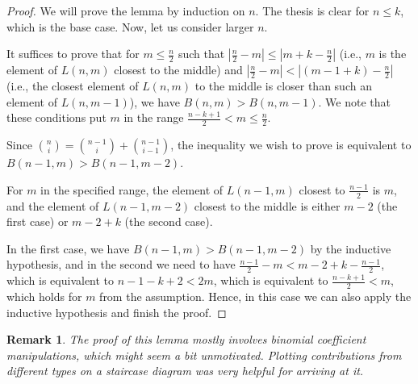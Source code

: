 \documentclass[11pt, reqno]{amsart}
\newtheorem*{remark}{Remark}
\numberwithin{equation}{section}
\begin{document}
\begin{proof}
    We will prove the lemma by induction on $n$.
    The thesis is clear for $n \leqslant k$, which is the base case. Now, let us consider larger $n$.

    It suffices to prove that for $m \leqslant \frac{n}{2}$ such that $|\frac{n}{2}-m|\leqslant |m+k-\frac{n}{2}|$ (i.e., $m$ is the element of $L(n, m)$ closest to the middle) and $|\frac{n}{2}-m|<|(m-1+k)-\frac{n}{2}|$ (i.e., the closest element of $L(n, m)$ to the middle is closer than such an element of $L(n, m-1)$), we have $B(n, m)>B(n, m-1)$. We note that these conditions put $m$ in the range $\frac{n-k+1}{2} < m \leqslant \frac{n}{2}$.
    
    Since $\binom{n}{i}=\binom{n-1}{i} + \binom{n-1}{i-1}$, the inequality we wish to prove is equivalent to $B(n-1, m) > B(n-1, m-2)$.
    
    For $m$ in the specified range, the element of $L(n-1, m)$ closest to $\frac{n-1}{2}$ is $m$, and the element of $L(n-1, m-2)$ closest to the middle is either $m-2$ (the first case) or $m-2+k$ (the second case).
    
    In the first case, we have $B(n-1, m) > B(n-1, m-2)$ by the inductive hypothesis, and in the second we need to have $\frac{n-1}{2}-m<m-2+k-\frac{n-1}{2}$, which is equivalent to $n-1-k+2<2m$, which is equivalent to $\frac{n-k+1}{2}<m$, which holds for $m$ from the assumption. Hence, in this case we can also apply the inductive hypothesis and finish the proof.
\end{proof}

\xminusxweightlemma*

\begin{remark}
    The proof of this lemma mostly involves binomial coefficient manipulations, which might seem a bit unmotivated. Plotting contributions from different types on a staircase diagram was very helpful for arriving at it.
\end{remark}
\end{document}
